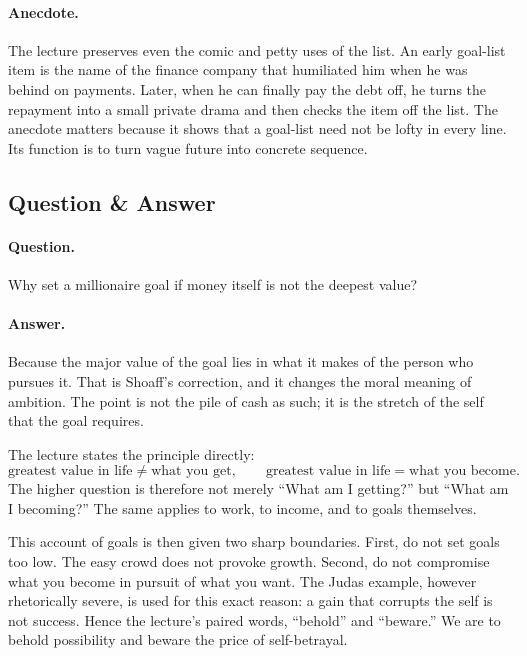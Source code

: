 \paragraph{Anecdote.} The lecture preserves even the comic and petty uses of the list. An early goal-list item is the name of the finance company that humiliated him when he was behind on payments. Later, when he can finally pay the debt off, he turns the repayment into a small private drama and then checks the item off the list. The anecdote matters because it shows that a goal-list need not be lofty in every line. Its function is to turn vague future into concrete sequence.

\subsection{Question \& Answer}

\paragraph{Question.} Why set a millionaire goal if money itself is not the deepest value?

\paragraph{Answer.} Because the major value of the goal lies in what it makes of the person who pursues it. That is Shoaff's correction, and it changes the moral meaning of ambition. The point is not the pile of cash as such; it is the stretch of the self that the goal requires.

The lecture states the principle directly:
\begin{equation}
\text{greatest value in life}\neq \text{what you get},
\qquad
\text{greatest value in life}=\text{what you become}.
\end{equation}
The higher question is therefore not merely ``What am I getting?'' but ``What am I becoming?'' The same applies to work, to income, and to goals themselves.

This account of goals is then given two sharp boundaries. First, do not set goals too low. The easy crowd does not provoke growth. Second, do not compromise what you become in pursuit of what you want. The Judas example, however rhetorically severe, is used for this exact reason: a gain that corrupts the self is not success. Hence the lecture's paired words, ``behold'' and ``beware.'' We are to behold possibility and beware the price of self-betrayal.

